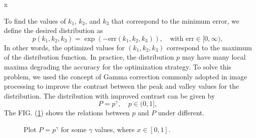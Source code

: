 x\documentclass[12pt, a4paper, reprint, nofootinbib, twoside,  showkeys]{revtex4-1}
\begin{document}
To find the values of $ k_1 $, $ k_2 $, and $ k_3 $ that correspond to the minimum error, we define the desired distribution as
\begin{equation}
p\left(k_1,k_2,k_3\right) = \exp\left(-\text{err}\left(k_1,k_2,k_3\right)\right), \quad \text{with }\mathrm{err}\in [0,\infty),
\end{equation}
In other words, the optimized values for $\left(k_1,k_2,k_3\right)$ correspond to the maximum of the distribution function. In practice, the distribution $p$ may have many local maxima degrading the accuracy for the optimization strategy. To solve this problem, we used the concept of Gamma correction commonly adopted in image processing to improve the contrast between the peak and valley values for the distribution. The distribution with improved contrast can be given by
\begin{equation}
P = p^{\gamma},\quad p\in (0,1],
\end{equation}
The FIG. (\ref{fig:gamma-plot}) shows the relations between $p$ and $P$ under different.
\begin{figure}[h]

	\caption{Plot $P=p^\gamma$ for some $\gamma$ values, where $x\in[0,1]$.}
	\label{fig:gamma-plot}
\end{figure}

\end{document}
